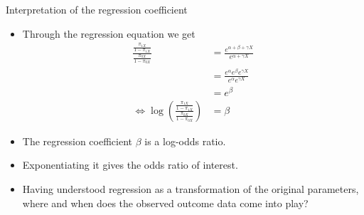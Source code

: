 \documentclass[10pt,handout]{beamer}\usepackage[]{graphicx}\usepackage[]{color}
\begin{document}
\begin{frame}{Interpretation of the regression coefficient}
	\begin{itemize}
		\item Through the regression equation we get
		$$
		\begin{aligned}
		\frac{\frac{\pi_{1 X}}{1-\pi_{1 X}}}{\frac{\pi_{0 X}}{1-\pi_{0 X}}} &=\frac{e^{\alpha+\beta+\gamma X}}{e^{\alpha+\gamma X}} \\
		&=\frac{e^{\alpha} e^{\beta} e^{\gamma X}}{e^{\alpha} e^{\gamma X}} \\
		&=e^{\beta} \\
		\Leftrightarrow \log \left(\frac{\frac{\pi_{1 X}}{1-\pi_{1 X}}}{\frac{\pi_{0 X}}{1-\pi_{0 X}}}\right) &=\beta
		\end{aligned}
		$$
		\item The regression coefficient $\beta$ is a log-odds ratio.
		\item Exponentiating it gives the odds ratio of interest.
		\item Having understood regression as a transformation of the original parameters, where and when does the observed outcome data come into play?
	\end{itemize}
\end{frame}
\end{document}
